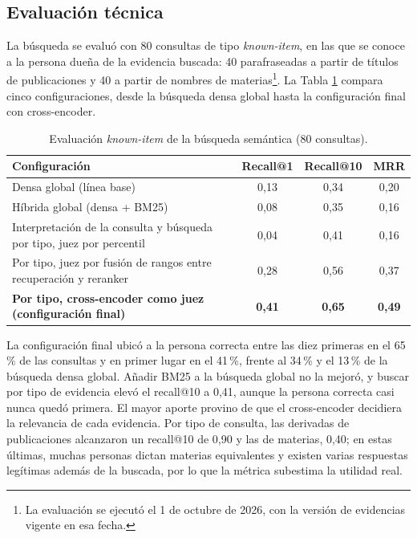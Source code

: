 \subsection{Evaluación técnica}
\label{sec:res_busqueda_evaluacion}

La búsqueda se evaluó con 80 consultas de tipo \textit{known-item}, en las que se conoce a la persona dueña de la evidencia buscada: 40 parafraseadas a partir de títulos de publicaciones y 40 a partir de nombres de materias\footnote{La evaluación se ejecutó el 1 de octubre de 2026, con la versión de evidencias vigente en esa fecha.}. La Tabla \ref{tab:busqueda} compara cinco configuraciones, desde la búsqueda densa global hasta la configuración final con cross-encoder.

\begin{table}[!htbp]
    \centering
    \caption{Evaluación \textit{known-item} de la búsqueda semántica (80 consultas).}
    \label{tab:busqueda}
    \small
    \begin{tabular}{>{\raggedright\arraybackslash}p{9.6cm} c c c}
        \toprule
        \textbf{Configuración} & \textbf{Recall@1} & \textbf{Recall@10} & \textbf{MRR} \\
        \midrule
        Densa global (línea base) & 0,13 & 0,34 & 0,20 \\
        Híbrida global (densa + BM25) & 0,08 & 0,35 & 0,16 \\
        Interpretación de la consulta y búsqueda por tipo, juez por percentil & 0,04 & 0,41 & 0,16 \\
        Por tipo, juez por fusión de rangos entre recuperación y reranker & 0,28 & 0,56 & 0,37 \\
        \textbf{Por tipo, cross-encoder como juez (configuración final)} & \textbf{0,41} & \textbf{0,65} & \textbf{0,49} \\
        \bottomrule
    \end{tabular}
\end{table}

La configuración final ubicó a la persona correcta entre las diez primeras en el 65\,\% de las consultas y en primer lugar en el 41\,\%, frente al 34\,\% y el 13\,\% de la búsqueda densa global. Añadir BM25 a la búsqueda global no la mejoró, y buscar por tipo de evidencia elevó el recall@10 a 0,41, aunque la persona correcta casi nunca quedó primera. El mayor aporte provino de que el cross-encoder decidiera la relevancia de cada evidencia. Por tipo de consulta, las derivadas de publicaciones alcanzaron un recall@10 de 0,90 y las de materias, 0,40; en estas últimas, muchas personas dictan materias equivalentes y existen varias respuestas legítimas además de la buscada, por lo que la métrica subestima la utilidad real.

